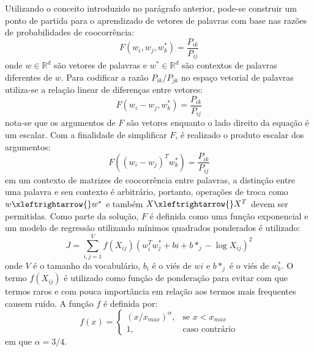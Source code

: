 Utilizando o conceito introduzido no parágrafo anterior, pode-se construir um ponto de partida para o aprendizado de vetores de palavras com base nas razões de probabilidades de coocorrência:
\begin{equation}
    \label{eq:glove_model_start_point}
    F(w_i, w_j, w^*_k) = \frac{P_{ik}}{P_{ij}}
\end{equation}
onde $w \in \mathbb{R}^d$ são vetores de palavras e $w^* \in \mathbb{R}^d$ são contextos de palavras diferentes de $w$. Para codificar a razão $P_{ik}/P_{jk}$ no espaço vetorial de palavras utiliza-se a relação linear de diferenças entre vetores:
\begin{equation}
    \label{eq:glove_model_linearity}
    F(w_i - w_j, w^*_k) = \frac{P_{ik}}{P_{ij}}
\end{equation}
nota-se que os argumentos de $F$ são vetores enquanto o lado direito da equação é um escalar. Com a finalidade de simplificar $F$, é realizado o produto escalar dos argumentos:
\begin{equation}
    \label{eq:glove_model_dot_product}
    F((w_i - w_j)^T w^*_k) = \frac{P_{ik}}{P_{ij}}
\end{equation}
em um contexto de matrizes de coocorrência entre palavras, a distinção entre uma palavra e seu contexto é arbitrário, portanto, operações de troca como $w \xleftrightarrow{} w^*$ e também $X \xleftrightarrow{} X^T$ devem ser permitidas. Como parte da solução, $F$ é definida como uma função exponencial e um modelo de regressão utilizando mínimos quadrados ponderados é utilizado:
\begin{equation}
    \label{eq:glove_model_least_square}
    J = \sum_{i,j=1}^{V} f(X_{ij}) \left ( w_i^T w^*_j + bi + b*_j - \log X_{ij} \right ) ^2
\end{equation}
onde $V$ é o tamanho do vocabulário, $b_i$ é o viés de $wi$ e $b*_j$ é o viés de $w^*_k$. O termo $f(X_{ij})$ é utilizado como função de ponderação para evitar com que termos raros e com pouca importância em relação aos termos mais frequentes causem ruído. A função $f$ é definida por:
\begin{equation}
    \label{eq:glove_model_weight}
    f(x)= 
    \begin{cases}
        (x/x_{max})^\alpha,& \text{se } x < x_{max} \\
        1,                 & \text{caso contrário}
    \end{cases}
\end{equation}
em que $\alpha = 3/4$.

